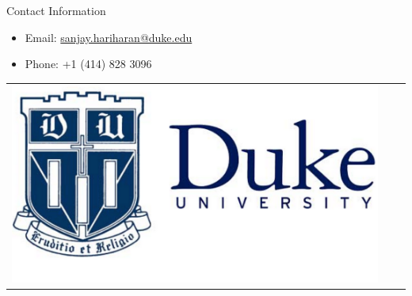 \documentclass[final]{beamer}
\newlength{\onecolwid}
\begin{document}
\begin{frame}[t]
\begin{columns}[t]
\begin{column}{\onecolwid}
\begin{alertblock}{Contact Information}

\begin{itemize}
\item Email: \href{mailto:sanjay.hariharan@duke.edu}{sanjay.hariharan@duke.edu}
\item Phone: +1 (414) 828 3096
\end{itemize}

\end{alertblock}

\begin{center}
\begin{tabular}{ccc}
\includegraphics[width=0.8\linewidth]{graphics/duke_logo.png}
\end{tabular}
\end{center}


\end{column} %

\end{columns} %

\end{frame} %
\end{document}
